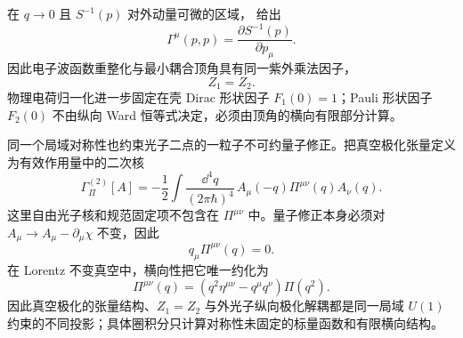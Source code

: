 在 $q\to0$ 且 $S^{-1}(p)$ 对外动量可微的区域， 给出
\begin{equation}
\boxed{
\Gamma^\mu(p,p)
=\frac{\partial S^{-1}(p)}{\partial p_\mu}.}
\label{eq:qed_ward_zero_momentum_vertex_derivative}
\end{equation}
因此电子波函数重整化与最小耦合顶角具有同一紫外乘法因子，
\begin{equation}
\boxed{Z_1=Z_2.}
\label{eq:qed_ward_z1_equals_z2}
\end{equation}
物理电荷归一化进一步固定在壳 Dirac 形状因子 $F_1(0)=1$；Pauli 形状因子 $F_2(0)$ 不由纵向 Ward 恒等式决定，必须由顶角的横向有限部分计算。

同一个局域对称性也约束光子二点的一粒子不可约量子修正。把真空极化张量定义为有效作用量中的二次核
\begin{equation}
\boxed{
\Gamma_{\Pi}^{(2)}[A]
=-\frac12\int\frac{\dd^4 q}{(2\pi\hbar)^4}\,
A_\mu(-q)\Pi^{\mu\nu}(q)A_\nu(q).}
\label{eq:qed-vacpol-quadratic-kernel-dp68}
\end{equation}
这里自由光子核和规范固定项不包含在 \(\Pi^{\mu\nu}\) 中。量子修正本身必须对 \(A_\mu\to A_\mu-\partial_\mu\chi\) 不变，因此
\begin{equation}
\boxed{q_\mu\Pi^{\mu\nu}(q)=0.}
\label{eq:qed_vacuum_polarization_transversality_from_1pi}
\end{equation}
在 Lorentz 不变真空中，横向性把它唯一约化为
\begin{equation}
\boxed{
\Pi^{\mu\nu}(q)
=\left(q^2\eta^{\mu\nu}-q^\mu q^\nu\right)\Pi(q^2).}
\label{eq:qed_vacuum_polarization_transverse_decomposition}
\end{equation}
因此真空极化的张量结构、$Z_1=Z_2$ 与外光子纵向极化解耦都是同一局域 $U(1)$ 约束的不同投影；具体圈积分只计算对称性未固定的标量函数和有限横向结构。
